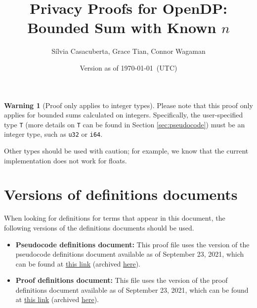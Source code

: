 \documentclass[11pt,a4paper]{article}
\title{Privacy Proofs for OpenDP: Bounded Sum with Known $n$}
\author{S\'ilvia Casacuberta, Grace Tian, Connor Wagaman}
\date{Version as of \today~(UTC)}
\theoremstyle{definition}
\newtheorem{warning}{Warning}
\begin{document}
\maketitle

\tableofcontents

\bigskip

\begin{tcolorbox}
\begin{warning}[Proof only applies to integer types]
Please note that this proof only applies for bounded sums calculated on integers. Specifically, the user-specified type \texttt{T} (more details on \texttt{T} can be found in Section \ref{sec:pseudocode}) must be an integer type, such as \texttt{u32} or \texttt{i64}.

Other types should be used with caution; for example, we know that the current implementation does not work for floats.
\end{warning}
\end{tcolorbox}

\section{Versions of definitions documents}
\label{sec:versioned-docs}

When looking for definitions for terms that appear in this document, the following versions of the definitions documents should be used.

\begin{itemize}
    \item \textbf{Pseudocode definitions document:} This proof file uses the version of the pseudocode definitions document available as of September 23, 2021, which can be found at \href{https://github.com/opendp/whitepapers/blob/pseudocode-defns/pseudocode-defns/pseudocode_defns.pdf}{this link} (archived \href{https://github.com/opendp/whitepapers/blob/cfab535367f592c1242ab880002cc726822506a0/pseudocode-defns/pseudocode_defns.pdf}{here}).
    
    \item \textbf{Proof definitions document:} This file uses the version of the proof definitions document available as of September 23, 2021, which can be found at \href{https://github.com/opendp/whitepapers/blob/proof-defns/proof-defns/proof_defns.pdf}{this link} (archived \href{https://github.com/opendp/whitepapers/blob/f43bf7056a5fd3b6f7b4bb77d451eafa042fe8f7/proof-defns/proof_defns.pdf}{here}). 
\end{itemize}
\end{document}
